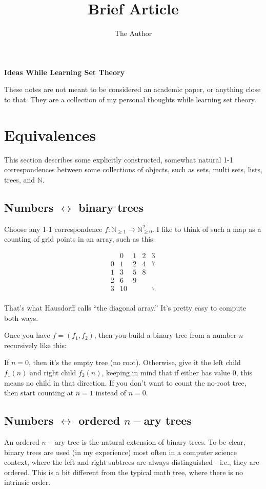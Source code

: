 \documentclass[11pt]{amsart}
\title{Brief Article}
\author{The Author}
\newcommand\N{\mathbb N}
\begin{document}
{\bf Ideas While Learning Set Theory}

These notes are not meant to be considered an academic paper,
or anything close to that. They are a collection of my personal
thoughts while learning set theory.

\section{Equivalences}

This section describes some explicitly constructed, somewhat natural 1-1 correspondences between
some collections of objects, such as sets, multi sets, lists, trees, and $\N$.

\subsection{Numbers $\leftrightarrow$ binary trees}

Choose any 1-1 correspondence $f : \N_{\ge 1} \to \N^2_{\ge 0}$.
I like to think of such a map as a counting of grid points in an array, such as this:

$$
\begin{array}{c|cccc}
 & 0 & 1 & 2 & 3 \\
 \hline
 0 & 1 & 2 & 4 & 7 \\
 1 & 3 & 5 & 8 \\
 2 & 6 & 9 \\
 3 & 10 &&& \ddots \\
\end{array}
$$

That's what Hausdorff calls ``the diagonal array.''
It's pretty easy to compute both ways.

Once you have $f = (f_1, f_2)$, then you build a binary
tree from a number $n$ recursively like this:

If $n=0$, then it's the empty tree (no root).
Otherwise, give it the left child $f_1(n)$ and
right child $f_2(n)$, keeping in mind that if
either has value 0, this means no child in that direction.
If you don't want to count the no-root tree, then start
counting at $n=1$ instead of $n=0$.

\subsection{Numbers $\leftrightarrow$ ordered $n-$ary trees}

An ordered $n-$ary tree is the natural extension of binary trees.
To be clear, binary trees are used (in my experience) most often
in a computer science context, where the left and right subtrees
are always distinguished - i.e., they are ordered. This is a bit
different from the typical math tree, where there is no intrinsic order.
\end{document}
